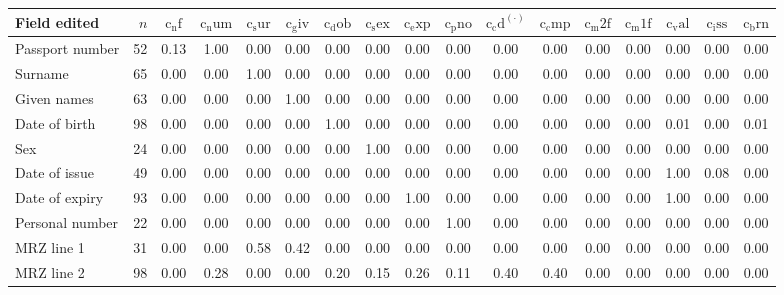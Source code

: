 \begin{tabular}{lrccccccccccccccc}
\toprule
Field edited & $n$ & $\mathrm{c_nf}$ & $\mathrm{c_num}$ & $\mathrm{c_sur}$ & $\mathrm{c_giv}$ & $\mathrm{c_dob}$ & $\mathrm{c_sex}$ & $\mathrm{c_exp}$ & $\mathrm{c_pno}$ & $\mathrm{c_cd}^{(\cdot)}$ & $\mathrm{c_cmp}$ & $\mathrm{c_m2f}$ & $\mathrm{c_m1f}$ & $\mathrm{c_val}$ & $\mathrm{c_iss}$ & $\mathrm{c_brn}$\\
\midrule
Passport number & 52 & 0.13 & 1.00 & 0.00 & 0.00 & 0.00 & 0.00 & 0.00 & 0.00 & 0.00 & 0.00 & 0.00 & 0.00 & 0.00 & 0.00 & 0.00\\
Surname & 65 & 0.00 & 0.00 & 1.00 & 0.00 & 0.00 & 0.00 & 0.00 & 0.00 & 0.00 & 0.00 & 0.00 & 0.00 & 0.00 & 0.00 & 0.00\\
Given names & 63 & 0.00 & 0.00 & 0.00 & 1.00 & 0.00 & 0.00 & 0.00 & 0.00 & 0.00 & 0.00 & 0.00 & 0.00 & 0.00 & 0.00 & 0.00\\
Date of birth & 98 & 0.00 & 0.00 & 0.00 & 0.00 & 1.00 & 0.00 & 0.00 & 0.00 & 0.00 & 0.00 & 0.00 & 0.00 & 0.01 & 0.00 & 0.01\\
Sex & 24 & 0.00 & 0.00 & 0.00 & 0.00 & 0.00 & 1.00 & 0.00 & 0.00 & 0.00 & 0.00 & 0.00 & 0.00 & 0.00 & 0.00 & 0.00\\
Date of issue & 49 & 0.00 & 0.00 & 0.00 & 0.00 & 0.00 & 0.00 & 0.00 & 0.00 & 0.00 & 0.00 & 0.00 & 0.00 & 1.00 & 0.08 & 0.00\\
Date of expiry & 93 & 0.00 & 0.00 & 0.00 & 0.00 & 0.00 & 0.00 & 1.00 & 0.00 & 0.00 & 0.00 & 0.00 & 0.00 & 1.00 & 0.00 & 0.00\\
Personal number & 22 & 0.00 & 0.00 & 0.00 & 0.00 & 0.00 & 0.00 & 0.00 & 1.00 & 0.00 & 0.00 & 0.00 & 0.00 & 0.00 & 0.00 & 0.00\\
MRZ line 1 & 31 & 0.00 & 0.00 & 0.58 & 0.42 & 0.00 & 0.00 & 0.00 & 0.00 & 0.00 & 0.00 & 0.00 & 0.00 & 0.00 & 0.00 & 0.00\\
MRZ line 2 & 98 & 0.00 & 0.28 & 0.00 & 0.00 & 0.20 & 0.15 & 0.26 & 0.11 & 0.40 & 0.40 & 0.00 & 0.00 & 0.00 & 0.00 & 0.00\\
\bottomrule
\end{tabular}

